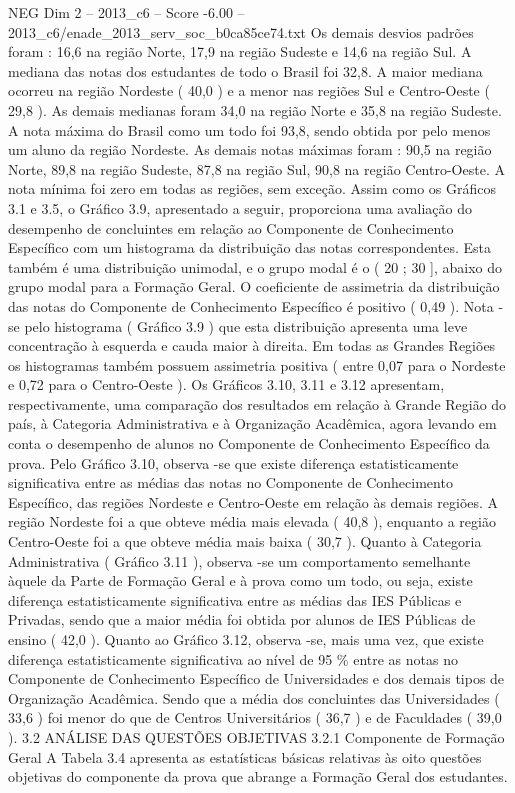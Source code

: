 \begin{textsample}{NEG Dim 2 – 2013\_c6 – Score -6.00 – 2013\_c6/enade\_2013\_serv\_soc\_b0ca85ce74.txt}
Os demais desvios padrões foram : 16,6 na região Norte, 17,9 na região Sudeste e 14,6 na região Sul.
A mediana das notas dos estudantes de todo o Brasil foi 32,8.
A maior mediana ocorreu na região Nordeste ( 40,0 ) e a menor nas regiões Sul e Centro-Oeste ( 29,8 ).
As demais medianas foram 34,0 na região Norte e 35,8 na região Sudeste.
A nota máxima do Brasil como um todo foi 93,8, sendo obtida por pelo menos um aluno da região Nordeste.
As demais notas máximas foram : 90,5 na região Norte, 89,8 na região Sudeste, 87,8 na região Sul, 90,8 na região Centro-Oeste.
A nota mínima foi zero em todas as regiões, sem exceção.
Assim como os Gráficos 3.1 e 3.5, o Gráfico 3.9, apresentado a seguir, proporciona uma avaliação do desempenho de concluintes em relação ao Componente de Conhecimento Específico com um histograma da distribuição das notas correspondentes.
Esta também é uma distribuição unimodal, e o grupo modal é o ( 20 ; 30 ], abaixo do grupo modal para a Formação Geral.
O coeficiente de assimetria da distribuição das notas do Componente de Conhecimento Específico é positivo ( 0,49 ).
Nota -se pelo histograma ( Gráfico 3.9 ) que esta distribuição apresenta uma leve concentração à esquerda e cauda maior à direita.
Em todas as Grandes Regiões os histogramas também possuem assimetria positiva ( entre 0,07 para o Nordeste e 0,72 para o Centro-Oeste ).
Os Gráficos 3.10, 3.11 e 3.12 apresentam, respectivamente, uma comparação dos resultados em relação à Grande Região do país, à Categoria Administrativa e à Organização Acadêmica, agora levando em conta o desempenho de alunos no Componente de Conhecimento Específico da prova.
Pelo Gráfico 3.10, observa -se que existe diferença estatisticamente significativa entre as médias das notas no Componente de Conhecimento Específico, das regiões Nordeste e Centro-Oeste em relação às demais regiões.
A região Nordeste foi a que obteve média mais elevada ( 40,8 ), enquanto a região Centro-Oeste foi a que obteve média mais baixa ( 30,7 ).
Quanto à Categoria Administrativa ( Gráfico 3.11 ), observa -se um comportamento semelhante àquele da Parte de Formação Geral e à prova como um todo, ou seja, existe diferença estatisticamente significativa entre as médias das IES Públicas e Privadas, sendo que a maior média foi obtida por alunos de IES Públicas de ensino ( 42,0 ).
Quanto ao Gráfico 3.12, observa -se, mais uma vez, que existe diferença estatisticamente significativa ao nível de 95 \% entre as notas no Componente de Conhecimento Específico de Universidades e dos demais tipos de Organização Acadêmica.
Sendo que a média dos concluintes das Universidades ( 33,6 ) foi menor do que de Centros Universitários ( 36,7 ) e de Faculdades ( 39,0 ). 3.2 ANÁLISE DAS QUESTÕES OBJETIVAS 3.2.1 Componente de Formação Geral A Tabela 3.4 apresenta as estatísticas básicas relativas às oito questões objetivas do componente da prova que abrange a Formação Geral dos estudantes.

\end{textsample}
